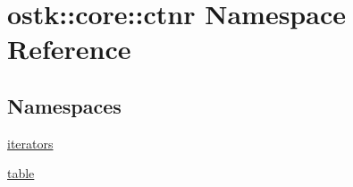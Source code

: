 \hypertarget{namespaceostk_1_1core_1_1ctnr}{}\section{ostk\+:\+:core\+:\+:ctnr Namespace Reference}
\label{namespaceostk_1_1core_1_1ctnr}
\subsection*{Namespaces}
\begin{DoxyCompactItemize}
\item 
 \hyperlink{namespaceostk_1_1core_1_1ctnr_1_1iterators}{iterators}
\item 
 \hyperlink{namespaceostk_1_1core_1_1ctnr_1_1table}{table}
\end{DoxyCompactItemize}
